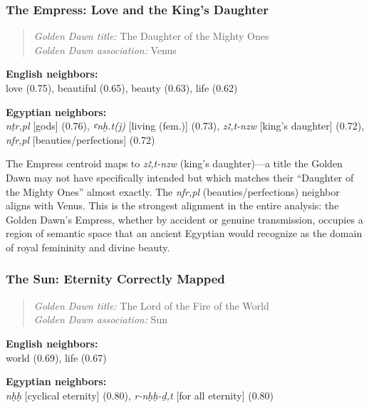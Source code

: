 \documentclass[11pt, a4paper]{article}
\begin{document}
\subsubsection{The Empress: Love and the King's Daughter}

\begin{quote}
\textit{Golden Dawn title:} The Daughter of the Mighty Ones \\
\textit{Golden Dawn association:} Venus
\end{quote}

\noindent\textbf{English neighbors:}\\
\hspace{1em}love (0.75), beautiful (0.65), beauty (0.63), life (0.62)

\noindent\textbf{Egyptian neighbors:}\\
\hspace{1em}\textit{nṯr,pl} [gods] (0.76), \textit{ꜥnḫ.t(j)} [living (fem.)] (0.73), \textit{zꜣ,t-nzw} [king's daughter] (0.72), \textit{nfr,pl} [beauties/perfections] (0.72)

\vspace{6pt}
 The Empress centroid maps to \textit{zꜣ,t-nzw} (king's daughter)---a title the Golden Dawn may not have specifically intended but which matches their ``Daughter of the Mighty Ones'' almost exactly. The \textit{nfr,pl} (beauties/perfections) neighbor aligns with Venus. This is the strongest alignment in the entire analysis: the Golden Dawn's Empress, whether by accident or genuine transmission, occupies a region of semantic space that an ancient Egyptian would recognize as the domain of royal femininity and divine beauty.

\subsubsection{The Sun: Eternity Correctly Mapped}

\begin{quote}
\textit{Golden Dawn title:} The Lord of the Fire of the World \\
\textit{Golden Dawn association:} Sun
\end{quote}

\noindent\textbf{English neighbors:}\\
\hspace{1em}world (0.69), life (0.67)

\noindent\textbf{Egyptian neighbors:}\\
\hspace{1em}\textit{nḥḥ} [cyclical eternity] (0.80), \textit{r-nḥḥ-ḏ,t} [for all eternity] (0.80)
\end{document}
